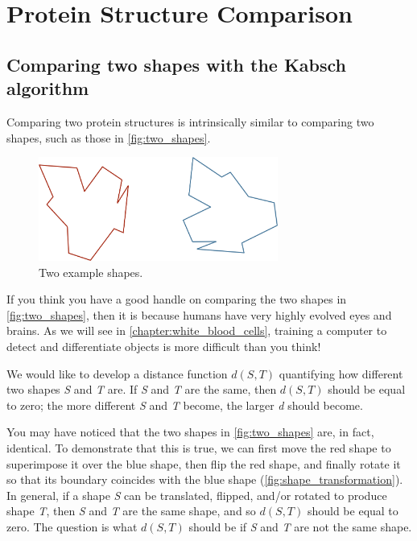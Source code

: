 \section{Protein Structure Comparison}
\label{sec:accuracy}

\subsection{Comparing two shapes with the Kabsch algorithm}

Comparing two protein structures is intrinsically similar to comparing two shapes, such as those in \autoref{fig:two_shapes}.\\

\begin{qbox}\end{qbox}

\begin{figure}[h]
	\centering
	\mySfFamily
	\includegraphics[width = 0.7\textwidth]{../images/two_shapes.png}
	\caption{Two example shapes.}
	\label{fig:two_shapes}
\end{figure}

If you think you have a good handle on comparing the two shapes in \autoref{fig:two_shapes}, then it is because humans have very highly evolved eyes and brains. As we will see in \autoref{chapter:white_blood_cells}, training a computer to detect and differentiate objects is more difficult than you think!

We would like to develop a distance function $d(S, T)$ quantifying how different two shapes \textit{S} and \textit{T} are. If \textit{S} and \textit{T} are the same, then $d(S, T)$ should be equal to zero; the more different \textit{S} and \textit{T} become, the larger \textit{d} should become.

You may have noticed that the two shapes in \autoref{fig:two_shapes} are, in fact, identical. To demonstrate that this is true, we can first move the red shape to superimpose it over the blue shape, then flip the red shape, and finally rotate it so that its boundary coincides with the blue shape (\autoref{fig:shape_transformation}). In general, if a shape \textit{S} can be translated, flipped, and/or rotated to produce shape \textit{T}, then \textit{S} and \textit{T} are the same shape, and so $d(S, T)$ should be equal to zero. The question is what $d(S, T)$ should be if \textit{S} and \textit{T} are not the same shape.

